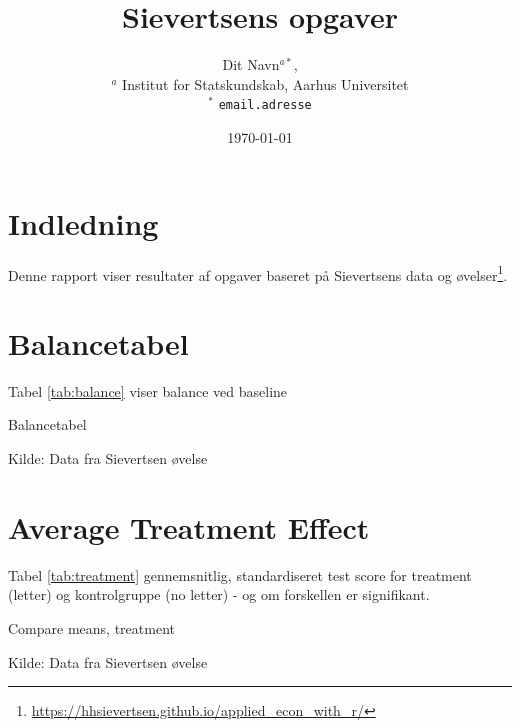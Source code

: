 \documentclass[12pt]{article}
\title{Sievertsens opgaver }
\author{Dit Navn$^{a*}$,  \\
        \small $^{a}$ Institut for Statskundskab, Aarhus Universitet \\
        \small $^{*}$ \tt{email.adresse}}
\date{\today} %
\begin{document}
\doublespacing

\maketitle




\section*{Indledning}
Denne rapport viser resultater af opgaver baseret på Sievertsens data og øvelser\footnote{\url{https://hhsievertsen.github.io/applied_econ_with_r/}}. 


\clearpage

\section*{Balancetabel}


Tabel \ref{tab:balance} viser balance ved baseline


\begin{table}[h] \centering
	\begin{threeparttable} 
		\caption{Balancetabel} \label{tab:balance}
			
		\begin{tablenotes}
            \item Kilde: Data fra Sievertsen øvelse
        \end{tablenotes}
	\end{threeparttable}
\end{table}


\section*{Average Treatment Effect}

Tabel \ref{tab:treatment} gennemsnitlig, standardiseret test score for treatment (letter) og kontrolgruppe (no letter) - og om forskellen er signifikant.


\begin{table}[h] \centering
	\begin{threeparttable} 
		\caption{Compare means, treatment} \label{tab:treatment}
			
		\begin{tablenotes}
            \item Kilde: Data fra Sievertsen øvelse
        \end{tablenotes}
	\end{threeparttable}
\end{table}
\end{document}
